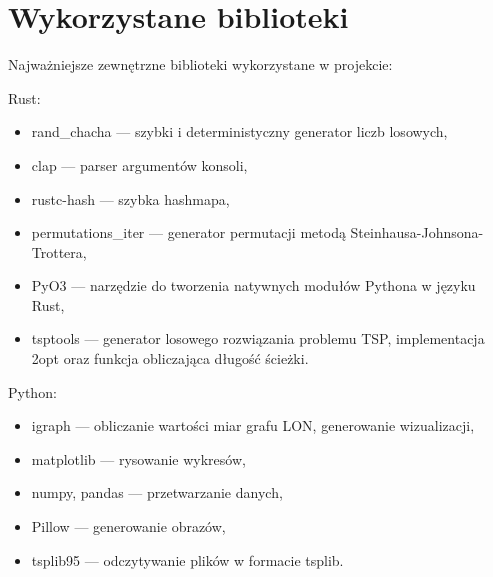 \section{Wykorzystane biblioteki}
Najważniejsze zewnętrzne biblioteki wykorzystane w projekcie:
\vspace{1em}

Rust:
\begin{itemize}
    \item rand\_chacha --- szybki i deterministyczny generator liczb losowych,
    \item clap --- parser argumentów konsoli,
    \item rustc-hash --- szybka hashmapa,
    \item permutations\_iter --- generator permutacji metodą Steinhausa-Johnsona-Trottera,
    \item PyO3 --- narzędzie do tworzenia natywnych modułów Pythona w języku Rust,
    \item tsptools --- generator losowego rozwiązania problemu TSP, implementacja 2opt oraz funkcja obliczająca długość ścieżki.
\end{itemize}

Python:
\begin{itemize}
    \item igraph --- obliczanie wartości miar grafu LON, generowanie wizualizacji,
    \item matplotlib --- rysowanie wykresów,
    \item numpy, pandas --- przetwarzanie danych,
    \item Pillow --- generowanie obrazów,
    \item tsplib95 --- odczytywanie plików w formacie tsplib.
\end{itemize}

